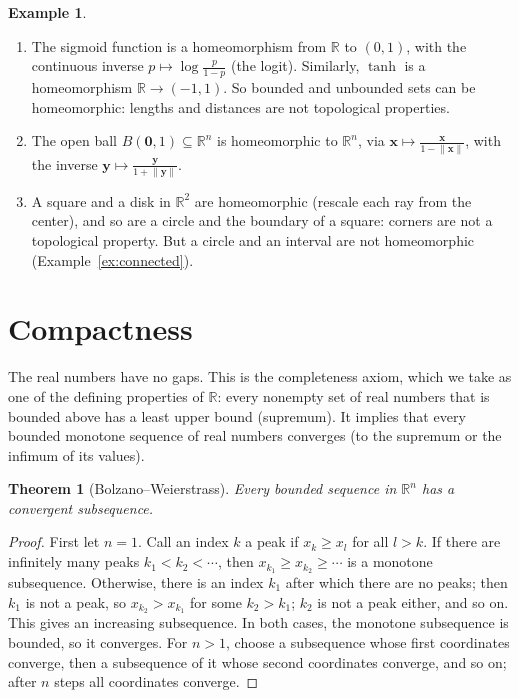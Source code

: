\documentclass[11pt]{article}
\newcommand{\norm}[1]{\lVert #1 \rVert}
\theoremstyle{definition}
\newtheorem{example}[definition]{Example}
\theoremstyle{plain}
\newtheorem{theorem}[definition]{Theorem}
\theoremstyle{remark}
\begin{document}
\begin{example}\label{ex:homeomorphisms}
    \begin{enumerate}
        \item The sigmoid function is a homeomorphism from $\mathbb{R}$ to $(0, 1)$, with the continuous inverse $p \mapsto \log\frac{p}{1 - p}$ (the logit). Similarly, $\tanh$ is a homeomorphism $\mathbb{R} \to (-1, 1)$. So bounded and unbounded sets can be homeomorphic: lengths and distances are not topological properties.
        \item The open ball $B(\mathbf{0}, 1) \subseteq \mathbb{R}^n$ is homeomorphic to $\mathbb{R}^n$, via $\mathbf{x} \mapsto \frac{\mathbf{x}}{1 - \norm{\mathbf{x}}}$, with the inverse $\mathbf{y} \mapsto \frac{\mathbf{y}}{1 + \norm{\mathbf{y}}}$.
        \item A square and a disk in $\mathbb{R}^2$ are homeomorphic (rescale each ray from the center), and so are a circle and the boundary of a square: corners are not a topological property. But a circle and an interval are not homeomorphic (Example~\ref{ex:connected}).
    \end{enumerate}
\end{example}

\section{Compactness}\label{sec:compact}

The real numbers have no gaps. This is the completeness axiom, which we take as one of the defining properties of $\mathbb{R}$: every nonempty set of real numbers that is bounded above has a least upper bound (supremum). It implies that every bounded monotone sequence of real numbers converges (to the supremum or the infimum of its values).

\begin{theorem}[Bolzano--Weierstrass]\label{thm:bolzano}
    Every bounded sequence in $\mathbb{R}^n$ has a convergent subsequence.
\end{theorem}

\begin{proof}
    First let $n = 1$. Call an index $k$ a peak if $x_k \geq x_l$ for all $l > k$. If there are infinitely many peaks $k_1 < k_2 < \cdots$, then $x_{k_1} \geq x_{k_2} \geq \cdots$ is a monotone subsequence. Otherwise, there is an index $k_1$ after which there are no peaks; then $k_1$ is not a peak, so $x_{k_2} > x_{k_1}$ for some $k_2 > k_1$; $k_2$ is not a peak either, and so on. This gives an increasing subsequence. In both cases, the monotone subsequence is bounded, so it converges. For $n > 1$, choose a subsequence whose first coordinates converge, then a subsequence of it whose second coordinates converge, and so on; after $n$ steps all coordinates converge.
\end{proof}
\end{document}
